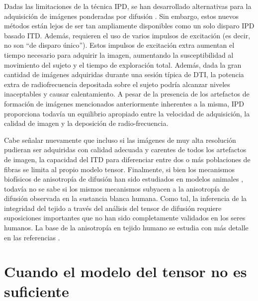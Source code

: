 Dadas las limitaciones de la técnica IPD, se han desarrollado alternativas para la adquisición de imágenes ponderadas por difusión \cite{111-116}. Sin embargo, estos nuevos métodos están lejos de ser tan ampliamente disponibles como un solo disparo IPD basado ITD. Además, requieren el uso de varios impulsos de excitación (es decir, no son ``de disparo único''). Estos impulsos de excitación extra aumentan el tiempo necesario para adquirir la imagen, aumentando la susceptibilidad al movimiento del sujeto y el tiempo de exploración total. Además, dada la gran cantidad de imágenes adquiridas durante una sesión típica de DTI, la potencia extra de radiofrecuencia depositada sobre el sujeto podría alcanzar niveles inaceptables y causar calentamiento. A pesar de la presencia de los artefactos de formación de imágenes mencionados anteriormente inherentes a la misma, IPD proporciona todavía un equilibrio apropiado entre la velocidad de adquisición, la calidad de imagen y la deposición de radio-frecuencia.

Cabe señalar nuevamente que incluso si las imágenes de muy alta resolución pudieran ser adquiridas con calidad adecuada y carentes de todos los artefactos de imagen, la capacidad del ITD para diferenciar entre dos o más poblaciones de fibras se limita al propio modelo tensor. Finalmente, si bien los mecanismos biofísicos de anisotropía de difusión han sido estudiados en modelos animales \cite{Beaulieu2002}, todavía no se sabe si los mismos mecanismos subyacen a la anisotropía de difusión observada en la sustancia blanca humana. Como tal, la inferencia de la integridad del tejido a través del análisis del tensor de difusión requiere suposiciones importantes que no han sido completamente validados en los seres humanos. La base de la anisotropía en tejido humano se estudia con más detalle en las referencias \cite{Beaulieu2002,117,118}.

\section{Cuando el modelo del tensor no es suficiente}

